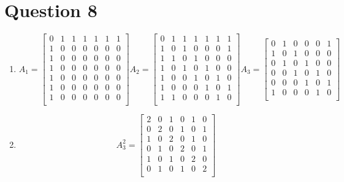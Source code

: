 \documentclass[11pt]{article}
\begin{document}
\section*{Question 8}
\begin{enumerate}[label=8\alph*]
\item
  \[
    A_1=
    \begin{bmatrix}
      0& 1& 1& 1& 1& 1 &1\\
      1& 0& 0& 0& 0& 0 &0\\
      1& 0& 0& 0& 0& 0 &0\\
      1& 0& 0& 0& 0& 0 &0\\
      1& 0& 0& 0& 0& 0 &0\\
      1& 0& 0& 0& 0& 0 &0\\
      1& 0& 0& 0& 0& 0 &0\\
    \end{bmatrix}
    A_2=
    \begin{bmatrix}
      0& 1& 1& 1& 1& 1 &1\\
      1& 0& 1& 0& 0& 0& 1\\
      1& 1& 0& 1& 0& 0& 0\\
      1& 0& 1& 0& 1& 0& 0\\
      1& 0& 0& 1& 0& 1& 0\\
      1& 0& 0& 0& 1& 0& 1\\
      1& 1& 0& 0& 0& 1& 0\\
    \end{bmatrix}
    A_3=
    \begin{bmatrix}
      0& 1& 0& 0& 0& 1\\
      1& 0& 1& 0& 0& 0\\
      0& 1& 0& 1& 0& 0\\
      0& 0& 1& 0& 1& 0\\
      0& 0& 0& 1& 0& 1\\
      1& 0& 0& 0& 1& 0\\
    \end{bmatrix}
  \]

\item
  \[
    A_3^2=
    \begin{bmatrix}
      2& 0& 1& 0& 1& 0\\
      0& 2& 0& 1& 0& 1\\
      1& 0& 2& 0& 1& 0\\
      0& 1& 0& 2& 0& 1\\
      1& 0& 1& 0& 2& 0\\
      0& 1& 0& 1& 0& 2\\
    \end{bmatrix}
  \]
\end{enumerate}
\end{document}
